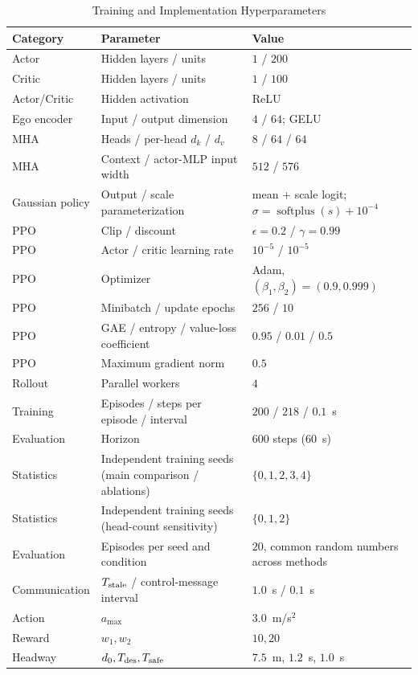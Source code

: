 \documentclass{ieeeaccess}
\begin{document}
\begin{table}[htbp]
\centering
\caption{Training and Implementation Hyperparameters}
\label{tab:training_hyperparameters}
\renewcommand{\arraystretch}{1.12}
\begin{tabular}{|l|l|l|}
\hline
\textbf{Category} & \textbf{Parameter} & \textbf{Value} \\ \hline
Actor & Hidden layers / units & $1$ / $200$ \\ \hline %
Critic & Hidden layers / units & $1$ / $100$ \\ \hline %
Actor/Critic & Hidden activation & ReLU \\ \hline %
Ego encoder & Input / output dimension & $4$ / $64$; GELU \\ \hline %
MHA & Heads / per-head $d_k$ / $d_v$ & $8$ / $64$ / $64$ \\ \hline %
MHA & Context / actor-MLP input width & $512$ / $576$ \\ \hline %
Gaussian policy & Output / scale parameterization & mean + scale logit; $\sigma=\operatorname{softplus}(s)+10^{-4}$ \\ \hline %
PPO & Clip / discount & $\epsilon=0.2$ / $\gamma=0.99$ \\ \hline %
PPO & Actor / critic learning rate & $10^{-5}$ / $10^{-5}$ \\ \hline %
PPO & Optimizer & Adam, $(\beta_1,\beta_2)=(0.9,0.999)$ \\ \hline %
PPO & Minibatch / update epochs & $256$ / $10$ \\ \hline %
PPO & GAE / entropy / value-loss coefficient & $0.95$ / $0.01$ / $0.5$ \\ \hline %
PPO & Maximum gradient norm & $0.5$ \\ \hline %
Rollout & Parallel workers & $4$ \\ \hline %
Training & Episodes / steps per episode / interval & $200$ / $218$ / $0.1$~s \\ \hline %
Evaluation & Horizon & $600$ steps ($60$~s) \\ \hline %
Statistics & Independent training seeds (main comparison / ablations) & $\{0,1,2,3,4\}$ \\ \hline %
Statistics & Independent training seeds (head-count sensitivity) & $\{0,1,2\}$ \\ \hline %
Evaluation & Episodes per seed and condition & $20$, common random numbers across methods \\ \hline %
Communication & $T_{\rm stale}$ / control-message interval & $1.0$~s / $0.1$~s \\ \hline %
Action & $a_{\max}$ & $3.0$~m/s$^2$ \\ \hline %
Reward & $w_1,w_2$ & $10,20$ \\ \hline %
Headway & $d_0,T_{\rm des},T_{\rm safe}$ & $7.5$~m, $1.2$~s, $1.0$~s \\ \hline %
\end{tabular}
\end{table}
\end{document}
